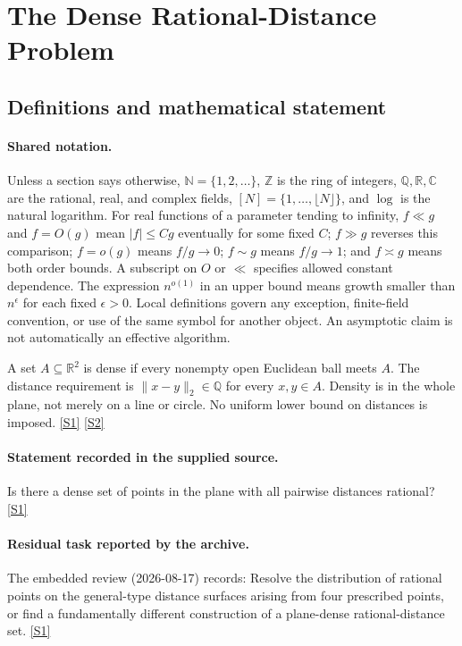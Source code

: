 \documentclass[11pt,a4paper]{article}
\newcommand{\N}{\mathbb{N}}
\newcommand{\Z}{\mathbb{Z}}
\newcommand{\Q}{\mathbb{Q}}
\newcommand{\R}{\mathbb{R}}
\newcommand{\C}{\mathbb{C}}
\newcommand{\sref}[2]{\hyperlink{source:#1:#2}{[S#2]}}
\begin{document}
\section{The Dense Rational-Distance Problem}\label{statement}


\subsection{Definitions and mathematical statement}

\paragraph{Shared notation.}Unless a section says otherwise, $\N=\{1,2,\ldots\}$,
$\Z$ is the ring of integers, $\Q,\R,\C$ are the rational, real, and complex
fields, $[N]=\{1,\ldots,\lfloor N\rfloor\}$, and $\log$ is the natural
logarithm. For real functions of a parameter tending to infinity,
$f\ll g$ and $f=O(g)$ mean $|f|\leq Cg$ eventually for some fixed $C$;
$f\gg g$ reverses this comparison; $f=o(g)$ means $f/g\to0$;
$f\sim g$ means $f/g\to1$; and $f\asymp g$ means both order bounds.
A subscript on $O$ or $\ll$ specifies allowed constant dependence.
The expression $n^{o(1)}$ in an upper bound means growth smaller than
$n^\epsilon$ for each fixed $\epsilon>0$. Local definitions govern any
exception, finite-field convention, or use of the same symbol for another
object. An asymptotic claim is not automatically an effective algorithm.



A set $A\subseteq\R^2$ is dense if every nonempty open Euclidean ball meets $A$. The distance requirement is $\|x-y\|_2\in\Q$ for every $x,y\in A$. Density is in the whole plane, not merely on a line or circle. No uniform lower bound on distances is imposed. \sref{statement}{1} \sref{statement}{2}

\paragraph{Statement recorded in the supplied source.}
Is there a dense set of points in the plane with all pairwise distances rational? \sref{statement}{1}

\paragraph{Residual task reported by the archive.}

The embedded review (2026-08-17) records: Resolve the distribution of rational points on the general-type distance surfaces arising from four prescribed points, or find a fundamentally different construction of a plane-dense rational-distance set. \sref{statement}{1}
\end{document}
